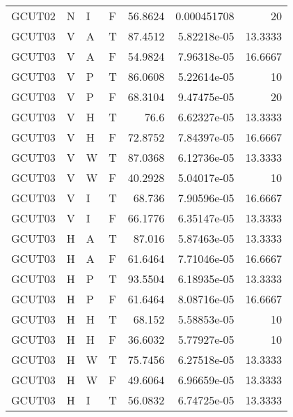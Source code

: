 \begin{longtable}{llllrrr}
    GCUT02   & N         & I         & F          & 56.8624    & 0.000451708 & 20       \\
    GCUT03   & V         & A         & T          & 87.4512    & 5.82218e-05 & 13.3333  \\
    GCUT03   & V         & A         & F          & 54.9824    & 7.96318e-05 & 16.6667  \\
    GCUT03   & V         & P         & T          & 86.0608    & 5.22614e-05 & 10       \\
    GCUT03   & V         & P         & F          & 68.3104    & 9.47475e-05 & 20       \\
    GCUT03   & V         & H         & T          & 76.6       & 6.62327e-05 & 13.3333  \\
    GCUT03   & V         & H         & F          & 72.8752    & 7.84397e-05 & 16.6667  \\
    GCUT03   & V         & W         & T          & 87.0368    & 6.12736e-05 & 13.3333  \\
    GCUT03   & V         & W         & F          & 40.2928    & 5.04017e-05 & 10       \\
    GCUT03   & V         & I         & T          & 68.736     & 7.90596e-05 & 16.6667  \\
    GCUT03   & V         & I         & F          & 66.1776    & 6.35147e-05 & 13.3333  \\
    GCUT03   & H         & A         & T          & 87.016     & 5.87463e-05 & 13.3333  \\
    GCUT03   & H         & A         & F          & 61.6464    & 7.71046e-05 & 16.6667  \\
    GCUT03   & H         & P         & T          & 93.5504    & 6.18935e-05 & 13.3333  \\
    GCUT03   & H         & P         & F          & 61.6464    & 8.08716e-05 & 16.6667  \\
    GCUT03   & H         & H         & T          & 68.152     & 5.58853e-05 & 10       \\
    GCUT03   & H         & H         & F          & 36.6032    & 5.77927e-05 & 10       \\
    GCUT03   & H         & W         & T          & 75.7456    & 6.27518e-05 & 13.3333  \\
    GCUT03   & H         & W         & F          & 49.6064    & 6.96659e-05 & 13.3333  \\
    GCUT03   & H         & I         & T          & 56.0832    & 6.74725e-05 & 13.3333  \\

\end{longtable}
